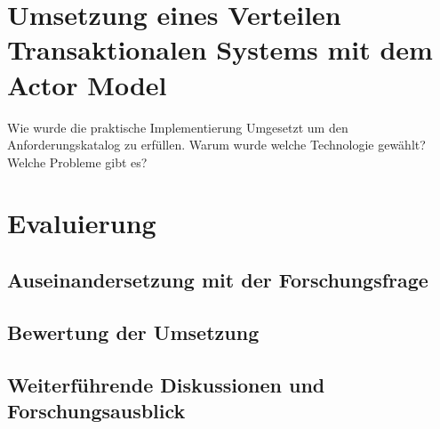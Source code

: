 

\chapter{Umsetzung eines Verteilen Transaktionalen Systems mit dem Actor Model}\label{cha:practicalDevelopment}
Wie wurde die praktische Implementierung Umgesetzt um den Anforderungskatalog zu erfüllen. Warum wurde welche Technologie gewählt? Welche Probleme gibt es? 

\chapter{Evaluierung} \label{cha:evaluation}
\section{Auseinandersetzung mit der Forschungsfrage}
\section{Bewertung der Umsetzung}\label{cha:rating}
\section{Weiterführende Diskussionen und Forschungsausblick}
